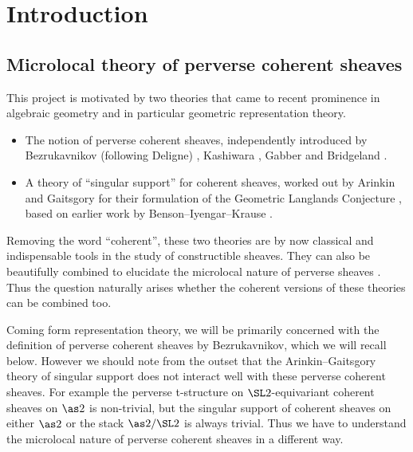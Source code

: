 \chapter{Introduction}

\section{Microlocal theory of perverse coherent sheaves}

This project is motivated by two theories that came to recent prominence in algebraic geometry and in particular geometric representation theory.
\begin{itemize}
    \item The notion of perverse coherent sheaves, independently introduced by Bezrukavnikov (following Deligne) \cite{ArinkinBezrukavnikov:2010:PerverseCoherentSheaves}, Kashiwara \cite{Kashiwara:2004:tStructureOnHolonomicDModuleCoherentOModules}, Gabber \cite{Gabber:2004:NotesOnSomeTStructures} and Bridgeland \cite{Bridgeland:2006:DerivedCategoriesOfCoherentSheaves}.
    \item A theory of \enquote{singular support} for coherent sheaves, worked out by Arinkin and Gaitsgory for their formulation of the Geometric Langlands Conjecture \cite{ArinkinGaitsgory:2015:SingularSupport}, based on earlier work by Benson--Iyengar--Krause \cite{BensonIyengarKrause:2008:LocalCohomologyAndSupportForTriangulatedCategories}.
\end{itemize}
Removing the word \enquote{coherent}, these two theories are by now classical and indispensable tools in the study of constructible sheaves.
They can also be beautifully combined to elucidate the microlocal nature of perverse sheaves \cite{KashiwaraSchapira:1994:SheavesOnManifolds}.
Thus the question naturally arises whether the coherent versions of these theories can be combined too.

Coming form representation theory, we will be primarily concerned with the definition of perverse coherent sheaves by Bezrukavnikov, which we will recall below.
However we should note from the outset that the Arinkin--Gaitsgory theory of singular support does not interact well with these perverse coherent sheaves.
For example the perverse t-structure on $\SL2$-equivariant coherent sheaves on $\as2$ is non-trivial, but the singular support of coherent sheaves on either $\as2$ or the stack $\as2/\SL2$ is always trivial.
Thus we have to understand the microlocal nature of perverse coherent sheaves in a different way.


